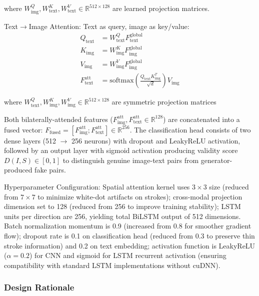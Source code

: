 \documentclass[journal]{IEEEtran}
\begin{document}
\noindent where $W_{\text{img}}^Q, W_{\text{text}}^K, W_{\text{text}}^V \in \mathbb{R}^{512 \times 128}$ are learned projection matrices.

Text$\rightarrow$Image Attention: Text as query, image as key/value:
\begin{align}
Q_{\text{text}} &= W_{\text{text}}^Q F_{\text{text}}^{\text{global}} \nonumber\\
K_{\text{img}} &= W_{\text{img}}^K F_{\text{img}}^{\text{global}} \nonumber\\
V_{\text{img}} &= W_{\text{img}}^V F_{\text{img}}^{\text{global}} \label{eq:cross_text_proj}\\
F_{\text{text}}^{\text{att}} &= \text{softmax}\left(\frac{Q_{\text{text}} K_{\text{img}}^T}{\sqrt{d}}\right) V_{\text{img}} \label{eq:cross_text_att}
\end{align}

\noindent where $W_{\text{text}}^Q, W_{\text{img}}^K, W_{\text{img}}^V \in \mathbb{R}^{512 \times 128}$ are symmetric projection matrices

Both bilaterally-attended features ($F_{\text{img}}^{\text{att}}, F_{\text{text}}^{\text{att}} \in \mathbb{R}^{128}$) are concatenated into a fused vector: $F_{\text{fused}} = [F_{\text{img}}^{\text{att}}; F_{\text{text}}^{\text{att}}] \in \mathbb{R}^{256}$. The classification head consists of two dense layers (512 $\rightarrow$ 256 neurons) with dropout and LeakyReLU activation, followed by an output layer with sigmoid activation producing validity score $D(I, S) \in [0, 1]$ to distinguish genuine image-text pairs from generator-produced fake pairs.

Hyperparameter Configuration: Spatial attention kernel uses $3 \times 3$ size (reduced from $7 \times 7$ to minimize white-dot artifacts on strokes); cross-modal projection dimension set to 128 (reduced from 256 to improve training stability); LSTM units per direction are 256, yielding total BiLSTM output of 512 dimensions. Batch normalization momentum is 0.9 (increased from 0.8 for smoother gradient flow); dropout rate is 0.1 on classification head (reduced from 0.3 to preserve thin stroke information) and 0.2 on text embedding; activation function is LeakyReLU ($\alpha=0.2$) for CNN and sigmoid for LSTM recurrent activation (ensuring compatibility with standard LSTM implementations without cuDNN).

\subsubsection{Design Rationale}
\end{document}
